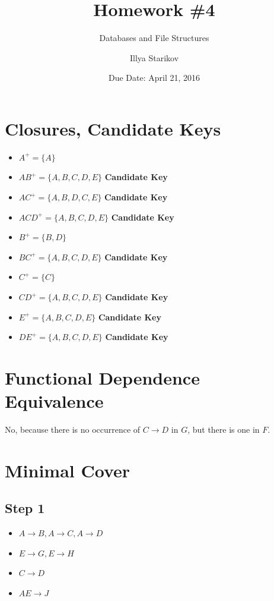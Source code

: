 \documentclass{scrartcl}
\title{Homework \#4}
\subtitle{Databases and File Structures}
\date{Due Date: April 21, 2016}
\author{Illya Starikov}
\begin{document}
\maketitle

\section{Closures, Candidate Keys}
\begin{itemize}
    \item $A^+ = \{ A \}$
    \item $AB^+ = \{ A, B, C, D, E \}$ \textbf{Candidate Key}
    \item $AC^+ = \{ A, B, D, C, E \}$ \textbf{Candidate Key}
    \item $ACD^+ = \{ A, B, C, D, E \}$ \textbf{Candidate Key}
    \item $B^+ = \{ B, D \}$
    \item $BC^+ = \{ A, B, C, D, E\}$ \textbf{Candidate Key}
    \item $C^+ = \{ C \}$
    \item $CD^+ = \{ A, B, C, D, E \}$ \textbf{Candidate Key}
    \item $E^+ = \{ A, B, C, D, E \}$ \textbf{Candidate Key}
    \item $DE^+ = \{ A, B, C, D, E \}$ \textbf{Candidate Key}
\end{itemize}

\section{Functional Dependence Equivalence}
No, because there is no occurrence of $C \rightarrow D$ in $G$, but there is one in $F$.


\section{Minimal Cover}
\subsection*{Step 1}
\begin{itemize}
    \item $A \rightarrow B, A \rightarrow C, A \rightarrow D$
    \item $E \rightarrow G, E \rightarrow H$
    \item $C \rightarrow D$
    \item $AE \rightarrow J$
\end{itemize}
\end{document}
